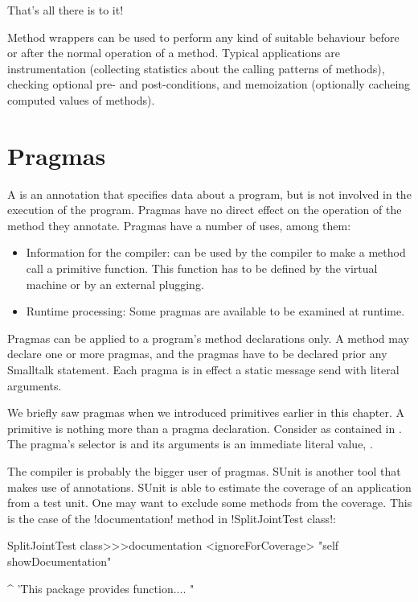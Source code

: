 \documentclass[a4paper,10pt,twoside]{book}
\begin{document}
That's all there is to it!

Method wrappers can be used to perform any kind of suitable behaviour before or after the normal operation of a method.  Typical applications are instrumentation (collecting statistics about the calling patterns of methods), checking optional pre- and post-conditions, and memoization (optionally cacheing computed values of methods).

\section{Pragmas}

A  is an annotation that specifies data about a program, but is not involved in the execution of the program. Pragmas have no direct effect on the operation of the method they annotate.
Pragmas have a number of uses, among them:
\begin{itemize}
\item Information for the compiler:  can be used by the compiler to make a method call a primitive function. This function has to be defined by the virtual machine or by an external plugging.
\item Runtime processing: Some pragmas are available to be examined at runtime.
\end{itemize}

Pragmas can be applied to a program's method declarations only. A method may declare one or more pragmas, and the pragmas have to be declared prior any Smalltalk statement. Each pragma is in effect a static message send with literal arguments.

We briefly saw pragmas when we introduced primitives earlier in this chapter. A primitive is nothing more than a pragma declaration.
Consider  as contained in . The pragma's selector is  and its arguments is an immediate literal value, .

The compiler is probably the bigger user of pragmas. SUnit is another tool that makes use of annotations. SUnit is able to estimate the coverage of an application from a test unit. One may want to exclude some methods from the coverage. This is the case of the \ct!documentation! method in \ct!SplitJointTest class!:

\begin{code}{}
SplitJointTest class>>>documentation
        <ignoreForCoverage>
        "self showDocumentation"

        ^ 'This package provides function.... "
\end{code}
\end{document}
